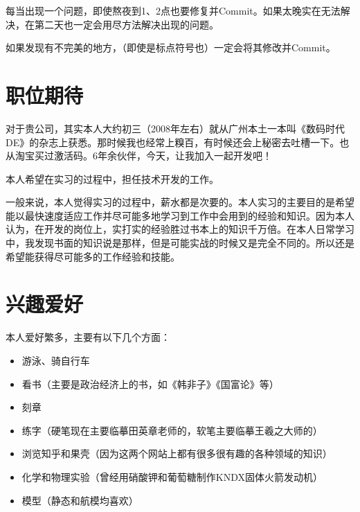 \documentclass[UTF8]{ctexart}
\begin{document}
每当出现一个问题，即使熬夜到1、2点也要修复并Commit。如果太晚实在无法解决，在第二天也一定会用尽方法解决出现的问题。

如果发现有不完美的地方，（即使是标点符号也）一定会将其修改并Commit。
\section{职位期待}

对于贵公司，其实本人大约初三（2008年左右）就从广州本土一本叫《数码时代DE》的杂志上获悉。那时候我也经常上糗百，有时候还会上秘密去吐槽一下。也从淘宝买过激活码。6年余伙伴，今天，让我加入一起开发吧！

本人希望在实习的过程中，担任技术开发的工作。

一般来说，本人觉得实习的过程中，薪水都是次要的。本人实习的主要目的是希望能以最快速度适应工作并尽可能多地学习到工作中会用到的经验和知识。因为本人认为，在开发的岗位上，实打实的经验胜过书本上的知识千万倍。在本人日常学习中，我发现书面的知识说是那样，但是可能实战的时候又是完全不同的。所以还是希望能获得尽可能多的工作经验和技能。
\section{兴趣爱好}
本人爱好繁多，主要有以下几个方面：
\begin{itemize}
\item 游泳、骑自行车
\item 看书（主要是政治经济上的书，如《韩非子》《国富论》等）
\item 刻章
\item 练字（硬笔现在主要临摹田英章老师的，软笔主要临摹王羲之大师的）
\item 浏览知乎和果壳（因为这两个网站上都有很多很有趣的各种领域的知识）
\item 化学和物理实验（曾经用硝酸钾和葡萄糖制作KNDX固体火箭发动机）
\item 模型（静态和航模均喜欢）
\end{itemize}
\end{document}
